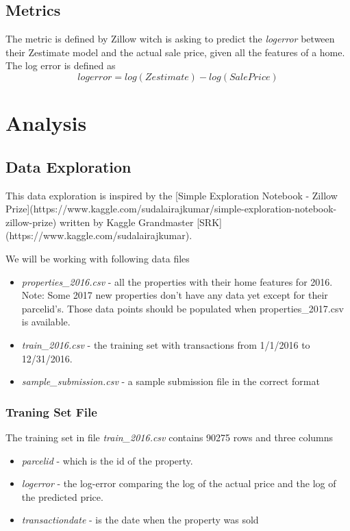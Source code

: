 \documentclass[a4paper]{article}
\begin{document}
\subsection{Metrics}
%
%
The metric is defined by Zillow witch is asking to predict the \textit{logerror} between their Zestimate model and the
actual sale price, given all the features of a home. The log error is defined as
\[ logerror = log(Zestimate) - log(SalePrice) \]


\section{Analysis}

\subsection{Data Exploration}
This data exploration is inspired by the [Simple Exploration Notebook - Zillow Prize](https://www.kaggle.com/sudalairajkumar/simple-exploration-notebook-zillow-prize)
written by Kaggle Grandmaster [SRK](https://www.kaggle.com/sudalairajkumar).

We will be working with following data files
\begin{itemize}
    \item \textit{properties\_2016.csv} - all the properties with their home features for 2016. Note: Some 2017 new
    properties don't have any data yet except for their parcelid's. Those data points should be populated when
    properties\_2017.csv is available.
    \item \textit{train\_2016.csv} - the training set with transactions from 1/1/2016 to 12/31/2016.
    \item \textit{sample\_submission.csv} - a sample submission file in the correct format
\end{itemize}

\subsubsection{Traning Set File}
The training set in file \textit{train\_2016.csv} contains 90275 rows and three columns
\begin{itemize}
    \item \textit{parcelid} - which is the id of the property.
    \item \textit{logerror} - the log-error comparing the log of the actual price and the log of the predicted price.
    \item \textit{transactiondate} - is the date when the property was sold
\end{itemize}
\end{document}
